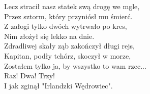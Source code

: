 Lecz stracił nasz statek swą drogę we mgle, \\
Przez sztorm, który przyniósł mu śmierć. \\
Z załogi tylko dwóch wytrwało po kres, \\
Nim złożył się lekko na dnie. \\
Zdradliwej skały ząb zakończył długi rejs, \\
Kapitan, podły tchórz, skoczył w morze, \\
Zostałem tylko ja, by wszystko to wam rzec... \\
Raz! Dwa! Trzy! \\
I jak zginął "Irlandzki Wędrowiec". \\